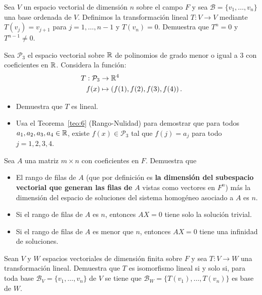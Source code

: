 \documentclass[12pt,a4paper]{book}
\newcommand{\llaves}[1]{\{#1\}}
\newcommand{\parentesis}[1]{\left(#1\right)}
\begin{document}
    \begin{ejercicio}
        Sea $V$ un espacio vectorial de dimensión $n$ sobre el campo $F$ y sea $\mathcal{B} = \llaves{v_{1}, \dots, v_{n}}$ una base ordenada de $V$. Definimos la transformación lineal $T:V \to V$ mediante $T(v_{j}) = v_{j + 1}$ para $j = 1, \dots, n-1$ y $T(v_{n}) = 0$. Demuestra que $T^{n} = 0$ y $T^{n-1} \neq 0$.
    \end{ejercicio}
    
    \begin{ejercicio}
        Sea $\mathcal{P}_{3}$ el espacio vectorial sobre $\mathbb{R}$ de polinomios de grado menor o igual a 3 con coeficientes en $\mathbb{R}$. Considera la función:
        \begin{align*}
            T: \mathcal{P}_{3} & \to \R^{4}\\
            f(x) & \mapsto \parentesis{f(1), f(2), f(3), f(4)}.
        \end{align*}
        \begin{itemize}
            \item[(a)] Demuestra que $T$ es lineal.
            \item[(b)] Usa el Teorema~\ref{teo:6} (Rango-Nulidad) para demostrar que para todos $a_{1}, a_{2}, a_{3}, a_{4} \in \mathbb{R}$, existe $f(x) \in \mathcal{P}_{3}$ tal que $f(j) = a_{j}$ para todo $j = 1, 2, 3, 4$.
        \end{itemize}
    \end{ejercicio}

    \begin{ejercicio}
        Sea $A$ una matriz $m \times n$ con coeficientes en $F$. Demuestra que
        \begin{itemize}
            \item[(a)] El rango de filas de $A$ (que por definición es \textbf{la dimensión del subespacio vectorial que generan las filas de} $A$ vistas como vectores en $F^{n}$) más la dimensión del espacio de soluciones del sistema homogéneo asociado a $A$ es $n$.
            \item[(b)] Si el rango de filas de $A$ es $n$, entonces $AX = 0$ tiene solo la solución trivial.
            \item[(c)] Si el rango de filas de $A$ es menor que $n$, entonces $AX = 0$ tiene una infinidad de soluciones.
        \end{itemize}
    \end{ejercicio}
    
    \begin{ejercicio}
        Sean $V$ y $W$ espacios vectoriales de dimensión finita sobre $F$ y sea $T: V \to W$ una transformación lineal. Demuestra que $T$ es isomorfismo lineal si y solo si, para toda base $\mathcal{B}_{V} = \llaves{v_{1}, \dots, v_{n}}$ de $V$ se tiene que $\mathcal{B}_{W} = \llaves{T(v_{1}), \dots, T(v_{n})}$ es base de $W$.
    \end{ejercicio}
\end{document}
